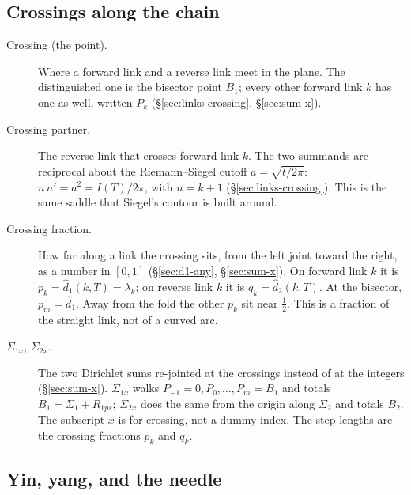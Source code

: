 \documentclass[11pt]{article}
\theoremstyle{definition}
\begin{document}
\subsection*{Crossings along the chain}

\begin{description}
\item[Crossing (the point).]
Where a forward link and a reverse link meet in the plane.
The distinguished one is the bisector point $B_1$; every other
forward link $k$ has one as well, written $P_k$
(\S\ref{sec:links-crossing}, \S\ref{sec:sum-x}).

\item[Crossing partner.]
The reverse link that crosses forward link $k$.
The two summands are reciprocal about the Riemann--Siegel cutoff
$a=\sqrt{t/2\pi}$:
$n\,n'=a^{2}=I(T)/2\pi$, with $n=k+1$
(\S\ref{sec:links-crossing}).
This is the same saddle that Siegel's contour is built around.

\item[Crossing fraction.]
How far along a link the crossing sits, from the left joint toward
the right, as a number in $[0,1]$
(\S\ref{sec:d1-any}, \S\ref{sec:sum-x}).
On forward link $k$ it is $p_k=\hat d_1(k,T)=\lambda_k$; on reverse
link $k$ it is $q_k=\hat d_2(k,T)$.
At the bisector, $p_m=\hat d_1$.
Away from the fold the other $p_k$ sit near $\tfrac12$.
This is a fraction of the straight link, not of a curved arc.

\item[$\Sigma_{1x}$, $\Sigma_{2x}$.]
The two Dirichlet sums re-jointed at the crossings instead of at
the integers
(\S\ref{sec:sum-x}).
$\Sigma_{1x}$ walks $P_{-1}=0,P_0,\dots,P_m=B_1$ and totals
$B_1=\Sigma_1+R_{1ps}$;
$\Sigma_{2x}$ does the same from the origin along $\Sigma_2$ and
totals $B_2$.
The subscript $x$ is for crossing, not a dummy index.
The step lengths are the crossing fractions $p_k$ and $q_k$.
\end{description}

\subsection*{Yin, yang, and the needle}
\end{document}
